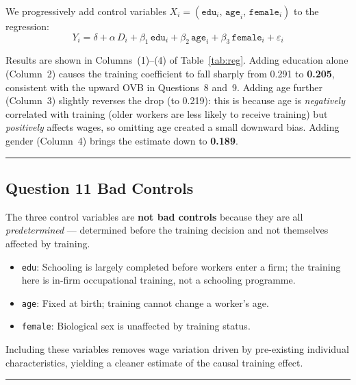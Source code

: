 \documentclass[paper=a4, fontsize=11pt]{scrartcl}
\newcommand{\horrule}[1]{\rule{\linewidth}{#1}}
\begin{document}
We progressively add control variables $X_i = (\texttt{edu}_i,\,\texttt{age}_i,\,\texttt{female}_i)$
to the regression:
\begin{equation}
  Y_i = \delta + \alpha \, D_i + \beta_1\,\texttt{edu}_i
        + \beta_2\,\texttt{age}_i + \beta_3\,\texttt{female}_i + \varepsilon_i
  \label{eq:controls}
\end{equation}

Results are shown in Columns~(1)--(4) of Table~\ref{tab:reg}.
Adding education alone (Column~2) causes the training coefficient to fall sharply from
0.291 to \textbf{0.205}, consistent with the upward OVB in Questions~8 and~9.
Adding age further (Column~3) slightly reverses the drop (to 0.219): this is because
age is \emph{negatively} correlated with training (older workers are less likely to
receive training) but \emph{positively} affects wages, so omitting age created a
small downward bias.
Adding gender (Column~4) brings the estimate down to \textbf{0.189}.

\bigskip\horrule{0.4pt}\bigskip

\subsection*{Question 11 \quad Bad Controls}

The three control variables are \textbf{not bad controls} because they are all
\emph{predetermined} --- determined before the training decision and not themselves
affected by training.

\begin{itemize}
  \item \texttt{edu}: Schooling is largely completed before workers enter a firm;
        the training here is in-firm occupational training, not a schooling programme.
  \item \texttt{age}: Fixed at birth; training cannot change a worker's age.
  \item \texttt{female}: Biological sex is unaffected by training status.
\end{itemize}

Including these variables removes wage variation driven by pre-existing individual
characteristics, yielding a cleaner estimate of the causal training effect.

\bigskip\horrule{0.4pt}\bigskip
\end{document}
